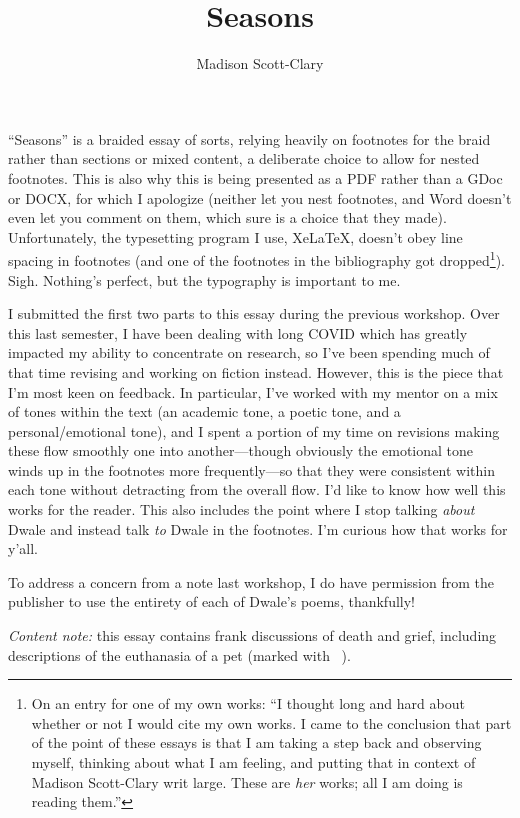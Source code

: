 \documentclass[12pt,oneside]{memoir}
\title{Seasons}
\author{Madison Scott-Clary}
\begin{document}

\frontmatter

``Seasons'' is a braided essay of sorts, relying heavily on footnotes for the braid rather than sections or mixed content, a deliberate choice to allow for nested footnotes. This is also why this is being presented as a PDF rather than a GDoc or DOCX, for which I apologize (neither let you nest footnotes, and Word doesn't even let you comment on them, which sure is a choice that they made). Unfortunately, the typesetting program I use, XeLaTeX, doesn't obey line spacing in footnotes (and one of the footnotes in the bibliography got dropped\footnote{On an entry for one of my own works: ``I thought long and hard about whether or not I would cite my own works. I came to the conclusion that part of the point of these essays is that I am taking a step back and observing myself, thinking about what I am feeling, and putting that in context of Madison Scott-Clary writ large. These are \emph{her} works; all I am doing is reading them.''}). Sigh. Nothing's perfect, but the typography is important to me.

I submitted the first two parts to this essay during the previous workshop. Over this last semester, I have been dealing with long COVID which has greatly impacted my ability to concentrate on research, so I've been spending much of that time revising and working on fiction instead. However, this is the piece that I'm most keen on feedback. In particular, I've worked with my mentor on a mix of tones within the text (an academic tone, a poetic tone, and a personal/emotional tone), and I spent a portion of my time on revisions making these flow smoothly one into another---though obviously the emotional tone winds up in the footnotes more frequently---so that they were consistent within each tone without detracting from the overall flow. I'd like to know how well this works for the reader. This also includes the point where I stop talking \emph{about} Dwale and instead talk \emph{to} Dwale in the footnotes. I'm curious how that works for y'all.

To address a concern from a note last workshop, I do have permission from the publisher to use the entirety of each of Dwale's poems, thankfully!

\mainmatter

\DoubleSpacing

\maketitle

\begin{center}
  \footnotesize \emph{Content note:} this essay contains frank discussions of death and grief, including descriptions of the euthanasia of a pet (marked with \Warn~).\normalsize
\end{center}

\vskip1cm


%
%


%
%

\printbibliography
\end{document}
